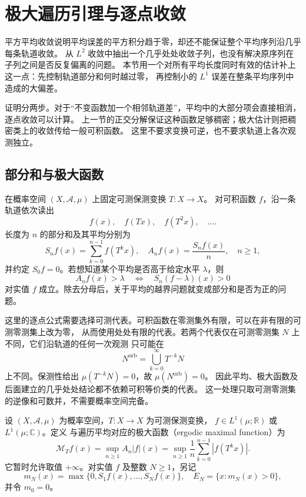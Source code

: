 \section{极大遍历引理与逐点收敛}
\label{b1:sec:3203}

平方平均收敛说明平均误差的平方积分趋于零，却还不能保证整个平均序列沿几乎每条轨道收敛。
从 \(L^2\) 收敛中抽出一个几乎处处收敛子列，也没有解决原序列在子列之间是否反复偏离的问题。
本节用一个对所有平均长度同时有效的估计补上这一点：先控制轨道部分和何时越过零，
再控制小的 \(L^1\) 误差在整条平均序列中造成的大偏差。

\ProseParagraphBreak

证明分两步。对于“不变函数加一个相邻轨道差”，平均中的大部分项会直接相消，逐点收敛可以计算。
上一节的正交分解保证这种函数足够稠密；极大估计则把稠密类上的收敛传给一般可积函数。
这里不要求变换可逆，也不要求轨道上各次观测独立。

\subsection{部分和与极大函数}
\label{b1:subsec:320301}

在概率空间 \((X,\mathcal A,\mu)\) 上固定可测保测变换 \(T:X\to X\)。
对可积函数 \(f\)，沿一条轨道依次读出
\[
 f(x),\quad f(Tx),\quad f(T^2x),\quad\ldots.
\]
长度为 \(n\) 的部分和及其平均分别为
\[
 S_n f(x)=\sum_{k=0}^{n-1}f(T^kx),
 \quad A_n f(x)=\frac{S_n f(x)}n,\quad n\geq1,
\]
并约定 \(S_0f=0\)。若想知道某个平均是否高于给定水平 \(\lambda\)，则
\[
 A_n f(x)>\lambda
 \quad\Longleftrightarrow\quad
 S_n(f-\lambda)(x)>0
\]
对实值 \(f\) 成立。除去分母后，关于平均的越界问题就变成部分和是否为正的问题。

\ProseParagraphBreak

这里的逐点公式需要选择可测代表。可积函数在零测集外有限，可以在非有限的可测零测集上改为零，
从而使用处处有限的代表。若两个代表仅在可测零测集 \(N\) 上不同，它们沿轨道的任何一次观测
只可能在
\[
 N^{\mathrm{orb}}=\bigcup_{k=0}^{\infty}T^{-k}N
\]
上不同。保测性给出 \(\mu(T^{-k}N)=0\)，故 \(\mu(N^{\mathrm{orb}})=0\)。
因此平均、极大函数及后面建立的几乎处处结论都不依赖可积等价类的代表。
这一处理只取可测零测集的逆像和可数并，不需要概率空间完备。

\begin{definition}[遍历平均的极大函数]
\label{b1:def:ergodic-maximal-32}
设 \((X,\mathcal A,\mu)\) 为概率空间，\(T:X\to X\) 为可测保测变换，
\(f\in L^1(\mu;\mathbb R)\) 或 \(L^1(\mu;\mathbb C)\)。定义
与遍历平均对应的极大函数（ergodic maximal function）为
\[
 \mathcal M_Tf(x)
 =\sup_{n\geq1}A_n|f|(x)
 =\sup_{n\geq1}\frac1n\sum_{k=0}^{n-1}|f(T^kx)|.
\]
它暂时允许取值 \(+\infty\)。对实值 \(f\) 及整数 \(N\geq1\)，另记
\[
 m_N(x)=\max\{0,S_1f(x),\ldots,S_Nf(x)\},
 \quad E_N=\{x:m_N(x)>0\},
\]
并令 \(m_0=0\)。
\end{definition}

